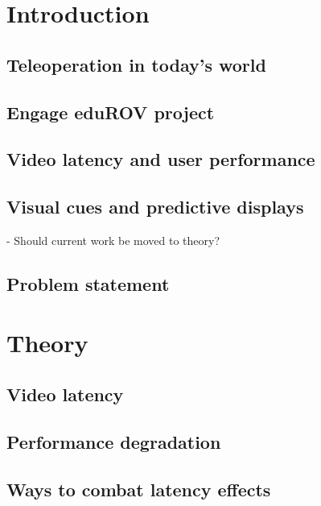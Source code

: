 \documentclass[b5paper,10pt,twoside]{book}
\begin{document}



{
\tableofcontents
}
{
\chapter{Introduction}
	\section{Teleoperation in today's world}
	\section{Engage eduROV project}
	\section{Video latency and user performance}
	\section{Visual cues and predictive displays}
	- Should current work be moved to theory?
	\section{Problem statement}
	
	
\chapter{Theory}
	\section{Video latency}
	\section{Performance degradation}
	\section{Ways to combat latency effects}
	}
\end{document}

